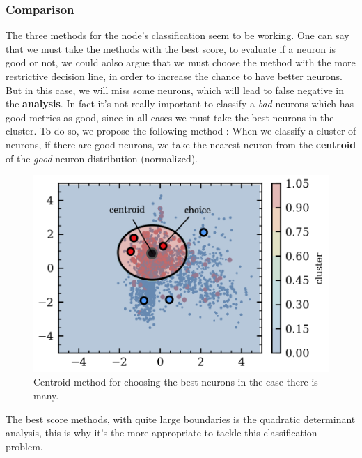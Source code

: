 \documentclass[11pt,a4paper]{report}
\begin{document}
\begin{multicols}{2}
    \subsubsection{Comparison}
    The three methods for the node's classification seem to be working. One can say that we must take the methods with the best score, to evaluate if a neuron is good or not, we could aolso argue that we must choose the method with the more restrictive decision line, in order to increase the chance to have better neurons. But in this case, we will miss some neurons, which will lead to false negative in the \textbf{analysis}.
    In fact it's not really important to  classify a \emph{bad} neurons which has good metrics as good, since in all cases we must take the best neurons in the cluster. To do so, we propose the following method : When we classify a cluster of neurons, if there are good neurons, we take the nearest neuron from the \textbf{centroid} of the \emph{good} neuron distribution (normalized).
    \begin{figure}[H]
        \centering
        \includegraphics[width=0.9\linewidth]{figure/cluster_choice.png}
        \caption{Centroid method for choosing the best neurons in the case there is many.}

    \end{figure}

    The best score methods, with quite large boundaries is the quadratic determinant analysis, this is why it's the more appropriate to tackle this classification problem.


\end{multicols}
\end{document}
